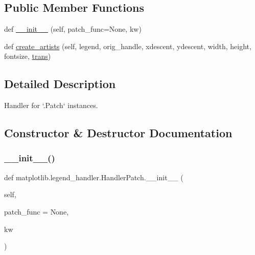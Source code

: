 \subsection*{Public Member Functions}
\begin{DoxyCompactItemize}
\item 
def \hyperlink{classmatplotlib_1_1legend__handler_1_1HandlerPatch_a98a5a809d7f482614d24bb5d9f27cdfb}{\+\_\+\+\_\+init\+\_\+\+\_\+} (self, patch\+\_\+func=None, kw)
\item 
def \hyperlink{classmatplotlib_1_1legend__handler_1_1HandlerPatch_a0625912a125911ebccebb1c0f5d769bd}{create\+\_\+artists} (self, legend, orig\+\_\+handle, xdescent, ydescent, width, height, fontsize, \hyperlink{size_2foo_8f90_afabfd8da71309850231a00e53c61f106}{trans})
\end{DoxyCompactItemize}


\subsection{Detailed Description}
\begin{DoxyVerb}Handler for `.Patch` instances.
\end{DoxyVerb}
 

\subsection{Constructor \& Destructor Documentation}
\mbox{\label{classmatplotlib_1_1legend__handler_1_1HandlerPatch_a98a5a809d7f482614d24bb5d9f27cdfb}} 
\subsubsection{\texorpdfstring{\+\_\+\+\_\+init\+\_\+\+\_\+()}{\_\_init\_\_()}}
{\footnotesize\ttfamily def matplotlib.\+legend\+\_\+handler.\+Handler\+Patch.\+\_\+\+\_\+init\+\_\+\+\_\+ (\begin{DoxyParamCaption}\item[{}]{self,  }\item[{}]{patch\+\_\+func = {\ttfamily None},  }\item[{}]{kw }\end{DoxyParamCaption})}

